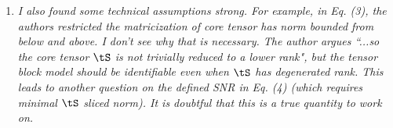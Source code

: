 \documentclass[11pt]{article}
\theoremstyle{definition}
\newtheorem{thm}{Theorem}
\theoremstyle{definition}
\newcommand{\of}[1]{\left(#1\right)}
\newcommand*{\KeepStyleUnderBrace}[1]{%
  \mathop{%
    \mathchoice
    {\underbrace{\displaystyle#1}}%
    {\underbrace{\textstyle#1}}%
    {\underbrace{\scriptstyle#1}}%
    {\underbrace{\scriptscriptstyle#1}}%
  }\limits
}
\begin{document}
\begin{enumerate}[wide, labelwidth=!, labelindent=0pt]
\begin{enumerate}




\end{enumerate}

\item \textit{I also found some technical assumptions strong.  For example, in Eq. (3), the authors restricted the matricization of core tensor has norm bounded from below and above. I don't see why that is necessary. The author argues ``...so the core tensor $\tS$ is not trivially reduced to a lower rank", but the tensor block model should be identifiable even when $\tS$ has degenerated rank. This leads to another question on the defined SNR in Eq. (4) (which requires minimal $\tS$ sliced norm). It is doubtful that this is a true quantity to work on.}


\end{enumerate}
\end{document}
